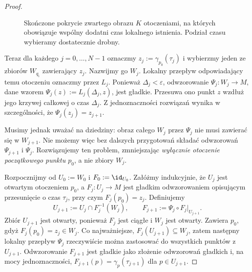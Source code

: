 \begin{proof}
\begin{figure}[H]
\centering
{}

\caption{Skończone pokrycie zwartego obrazu $K$ otoczeniami,
na których obowiązuje wspólny dodatni czas lokalnego istnienia.
Podział czasu wybieramy dostatecznie drobny.}
\label{fig:przeplyw-pokrycie}
\end{figure}

Teraz dla każdego $j=0,\ldots,N-1$ oznaczmy
$z_j:=\gamma_{p_0}(\tau_j)$ i wybierzmy jeden ze zbiorów
$W_{q_i}$ zawierający $z_j$. Nazwijmy go $W_j$.
Lokalny przepływ odpowiadający temu otoczeniu oznaczmy przez
$L_j$. Ponieważ $\Delta_j<\varepsilon$, odwzorowanie
$\Psi_j\colon W_j\to M$, dane wzorem
$\Psi_j(z):=L_j(\Delta_j,z)$, jest gładkie.
Przesuwa ono punkt $z$ wzdłuż jego krzywej całkowej o czas
$\Delta_j$. Z jednoznaczności rozwiązań wynika w szczególności,
że $\Psi_j(z_j)=z_{j+1}$.

Musimy jednak uważać na dziedziny: obraz całego $W_j$ przez
$\Psi_j$ nie musi zawierać się w $W_{j+1}$. Nie możemy więc bez
dalszych przygotowań składać odwzorowań $\Psi_{j+1}$ i $\Psi_j$.
Rozwiązujemy ten problem, zmniejszając \emph{wyłącznie otoczenie
początkowego punktu $p_0$}, a nie zbiory $W_j$.

Rozpocznijmy od $U_0:=W_0$ i $F_0:=\id_{U_0}$.
Załóżmy indukcyjnie, że $U_j$ jest otwartym otoczeniem $p_0$,
a $F_j\colon U_j\to M$ jest gładkim odwzorowaniem opisującym
przesunięcie o czas $\tau_j$, przy czym $F_j(p_0)=z_j$.
Definiujemy
\[
U_{j+1}:=U_j\cap F_j^{-1}(W_j),\qquad
F_{j+1}:=\Psi_j\circ F_j\big|_{U_{j+1}}.
\]
Zbiór $U_{j+1}$ jest otwarty, ponieważ $F_j$ jest ciągłe
i $W_j$ jest otwarty. Zawiera $p_0$, gdyż
$F_j(p_0)=z_j\in W_j$. Co najważniejsze,
$F_j(U_{j+1})\subseteq W_j$, zatem następny lokalny przepływ
$\Psi_j$ rzeczywiście można zastosować do wszystkich punktów
z $U_{j+1}$. Odwzorowanie $F_{j+1}$ jest gładkie jako złożenie
odwzorowań gładkich i, na mocy jednoznaczności,
$F_{j+1}(p)=\gamma_p(\tau_{j+1})$ dla $p\in U_{j+1}$.


\end{proof}
